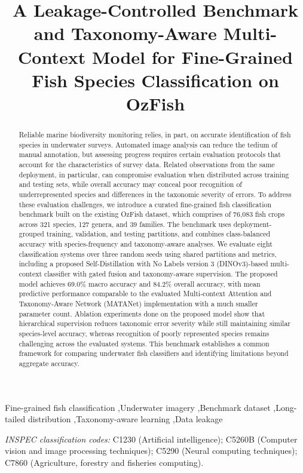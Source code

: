 \documentclass[preprint,12pt]{elsarticle}
\begin{document}
\begin{frontmatter}
\title{A Leakage-Controlled Benchmark and Taxonomy-Aware Multi-Context Model for Fine-Grained Fish Species Classification on OzFish}
\begin{abstract}
Reliable marine biodiversity monitoring relies, in part, on accurate
identification of fish species in underwater surveys. Automated image
analysis can reduce the tedium of manual annotation, but assessing
progress requires certain evaluation protocols that account for the
characteristics of survey data. Related observations from the same
deployment, in particular, can compromise evaluation when distributed
across training and testing sets, while overall accuracy may conceal
poor recognition of underrepresented species and differences in the
taxonomic severity of errors. To address these evaluation challenges, we
introduce a curated fine-grained fish classification benchmark built on
the existing OzFish dataset, which comprises of 76,083 fish crops across
321 species, 127 genera, and 39 families. The benchmark uses
deployment-grouped training, validation, and testing partitions, and
combines class-balanced accuracy with species-frequency and
taxonomy-aware analyses. We evaluate eight classification systems over
three random seeds using shared partitions and metrics, including a
proposed Self-Distillation with No Labels version 3 (DINOv3)-based
multi-context classifier with gated fusion and
taxonomy-aware supervision. The proposed model achieves 69.0\% macro
accuracy and 84.2\% overall accuracy, with mean predictive performance
comparable to the evaluated Multi-context Attention and Taxonomy-Aware
Network (MATANet) implementation with a much smaller
parameter count. Ablation experiments done on the proposed model show
that hierarchical supervision reduces taxonomic error severity while
still maintaining similar species-level accuracy, whereas recognition of
poorly represented species remains challenging across the evaluated
systems. This benchmark establishes a common framework for comparing
underwater fish classifiers and identifying limitations beyond aggregate
accuracy.
\end{abstract}
\begin{keyword}
Fine-grained fish classification \sep Underwater imagery \sep Benchmark dataset \sep Long-tailed distribution \sep Taxonomy-aware learning \sep Data leakage
\par\noindent\textit{INSPEC classification codes:} C1230 (Artificial intelligence); C5260B (Computer vision and image processing techniques); C5290 (Neural computing techniques); C7860 (Agriculture, forestry and fisheries computing).
\end{keyword}
\end{frontmatter}
\end{document}
